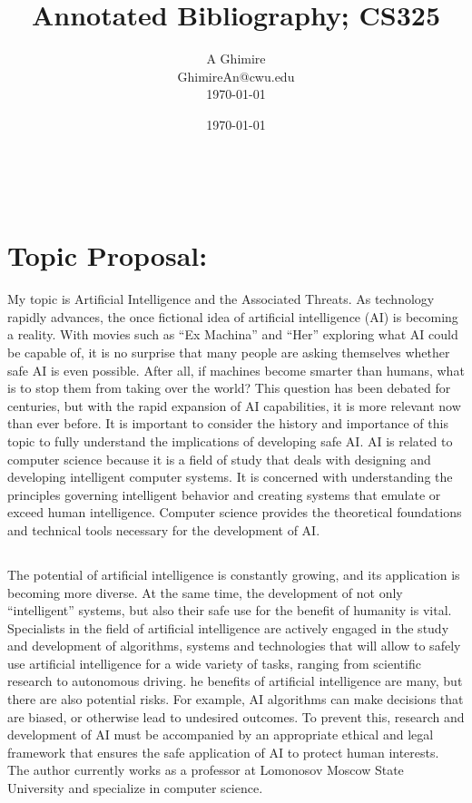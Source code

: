 \documentclass[12pt,letterpaper]{article}
\title{Annotated Bibliography; CS325}
\author{A Ghimire \\ GhimireAn@cwu.edu\\\today}
\date{\today}
\makeatletter
\renewcommand{\maketitle}{\bgroup
   \begin{center}
   \textbf{{\fontsize{18pt}{20}\selectfont \@title}}\\
   \vspace{10pt}
   {\fontsize{12pt}{0}\selectfont \@author} 
   \end{center}
}
\makeatother
\begin{document}
\maketitle


\thispagestyle{fancy}

\section*{Topic Proposal: }
My topic is Artificial Intelligence and the Associated Threats. As technology rapidly advances, the once fictional idea of artificial intelligence (AI) is becoming a reality. With movies such as “Ex Machina” and “Her” exploring what AI could be capable of, it is no surprise that many people are asking themselves whether safe AI is even possible. After all, if machines become smarter than humans, what is to stop them from taking over the world? This question has been debated for centuries, but with the rapid expansion of AI capabilities, it is more relevant now than ever before. It is important to consider the history and importance of this topic to fully understand the implications of developing safe AI. AI is related to computer science because it is a field of study that deals with designing and developing intelligent computer systems. It is concerned with understanding the principles governing intelligent behavior and creating systems that emulate or exceed human intelligence. Computer science provides the theoretical foundations and technical tools necessary for the development of AI. 


\subsection*{}
The potential of artificial intelligence is constantly growing, and its application is becoming more diverse. At the same time, the development of not only “intelligent” systems, but also their safe use for the benefit of humanity is vital. Specialists in the field of artificial intelligence are actively engaged in the study and development of algorithms, systems and technologies that will allow to safely use artificial intelligence for a wide variety of tasks, ranging from scientific research to autonomous driving. he benefits of artificial intelligence are many, but there are also potential risks. For example, AI algorithms can make decisions that are biased, or otherwise lead to undesired outcomes. To prevent this, research and development of AI must be accompanied by an appropriate ethical and legal framework that ensures the safe application of AI to protect human interests. The author currently works as a professor at Lomonosov Moscow State University and specialize in computer science.
\end{document}
